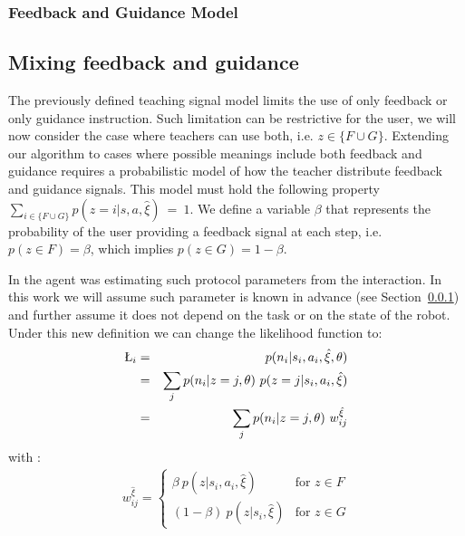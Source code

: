 \subsubsection{Feedback and Guidance Model}
\label{sec:advancedModel}


\subsection{Mixing feedback and guidance}
\label{sec:mixing}

The previously defined teaching signal model limits the use of only feedback or only guidance instruction. Such limitation can be restrictive for the user, we will now consider the case where teachers can use both, i.e. $z \in \{F \cup G\}$. Extending our algorithm to cases where possible meanings include both feedback and guidance requires a probabilistic model of how the teacher distribute feedback and guidance signals. This model must hold the following property $\sum_{i \in \{F \cup G\}} p(z = i|s,a,\hat{\xi})~=~1$. We define a variable $\beta$ that represents the probability of the user providing a feedback signal at each step, i.e. $p(z \in F) = \beta$, which implies $p(z \in G) = 1 - \beta$. 

In \cite{macl11simul} the agent was estimating such protocol parameters from the interaction. In this work we will assume such parameter is known in advance (see Section~\ref{sec:advancedModel}) and further assume it does not depend on the task or on the state of the robot. 
%
Under this new definition we can change the likelihood function to:
%
\begin{eqnarray}
\L_i &=&  p(n_i|s_i,a_i,\hat{\xi},\theta)\nonumber\\
                &=& \sum_{j} p(n_i|z = j,\theta)~p(z = j|s_i,a_i,\hat{\xi}) \nonumber\\
                &=& \sum_{j} p(n_i|z = j,\theta)~w_{ij}^{\hat{\xi}}
                \label{eq:likmix}
\end{eqnarray}
%
with :
%
\begin{eqnarray}
    w_{ij}^{\hat{\xi}} = 
        \begin{cases} 
            \beta~p(z|s_i,a_i,\hat{\xi}) &\mbox{for } z \in F \\
            (1- \beta)~p(z|s_i,\hat{\xi}) & \mbox{for } z \in G
        \end{cases} 
\end{eqnarray}

